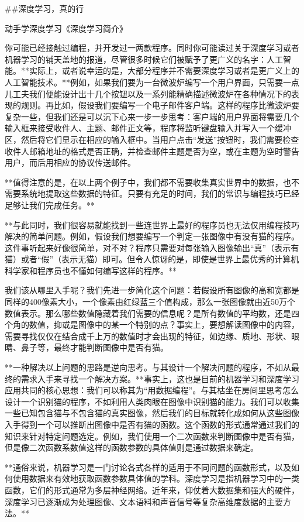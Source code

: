 

##深度学习，真的行

动手学深度学习《深度学习简介》

你可能已经接触过编程，并开发过一两款程序。同时你可能读过关于深度学习或者机器学习的铺天盖地的报道，尽管很多时候它们被赋予了更广义的名字：人工智能。**实际上，或者说幸运的是，大部分程序并不需要深度学习或者是更广义上的人工智能技术。**例如，如果我们要为一台微波炉编写一个用户界面，只需要一点儿工夫我们便能设计出十几个按钮以及一系列能精确描述微波炉在各种情况下的表现的规则。再比如，假设我们要编写一个电子邮件客户端。这样的程序比微波炉要复杂一些，但我们还是可以沉下心来一步一步思考：客户端的用户界面将需要几个输入框来接受收件人、主题、邮件正文等，程序将监听键盘输入并写入一个缓冲区，然后将它们显示在相应的输入框中。当用户点击“发送”按钮时，我们需要检查收件人邮箱地址的格式是否正确，并检查邮件主题是否为空，或在主题为空时警告用户，而后用相应的协议传送邮件。

**值得注意的是，在以上两个例子中，我们都不需要收集真实世界中的数据，也不需要系统地提取这些数据的特征。只要有充足的时间，我们的常识与编程技巧已经足够让我们完成任务。**

**与此同时，我们很容易就能找到一些连世界上最好的程序员也无法仅用编程技巧解决的简单问题。例如，假设我们想要编写一个判定一张图像中有没有猫的程序。这件事听起来好像很简单，对不对？程序只需要对每张输入图像输出“真”（表示有猫）或者“假”（表示无猫）即可。但令人惊讶的是，即使是世界上最优秀的计算机科学家和程序员也不懂如何编写这样的程序。**

我们该从哪里入手呢？我们先进一步简化这个问题：若假设所有图像的高和宽都是同样的400像素大小，一个像素由红绿蓝三个值构成，那么一张图像就由近50万个数值表示。那么哪些数值隐藏着我们需要的信息呢？是所有数值的平均数，还是四个角的数值，抑或是图像中的某一个特别的点？事实上，要想解读图像中的内容，需要寻找仅仅在结合成千上万的数值时才会出现的特征，如边缘、质地、形状、眼睛、鼻子等，最终才能判断图像中是否有猫。

**一种解决以上问题的思路是逆向思考。与其设计一个解决问题的程序，不如从最终的需求入手来寻找一个解决方案。**事实上，这也是目前的机器学习和深度学习应用共同的核心思想：我们可以称其为“用数据编程”。与其枯坐在房间里思考怎么设计一个识别猫的程序，不如利用人类肉眼在图像中识别猫的能力。我们可以收集一些已知包含猫与不包含猫的真实图像，然后我们的目标就转化成如何从这些图像入手得到一个可以推断出图像中是否有猫的函数。这个函数的形式通常通过我们的知识来针对特定问题选定。例如，我们使用一个二次函数来判断图像中是否有猫，但是像二次函数系数值这样的函数参数的具体值则是通过数据来确定。

**通俗来说，机器学习是一门讨论各式各样的适用于不同问题的函数形式，以及如何使用数据来有效地获取函数参数具体值的学科。深度学习是指机器学习中的一类函数，它们的形式通常为多层神经网络。近年来，仰仗着大数据集和强大的硬件，深度学习已逐渐成为处理图像、文本语料和声音信号等复杂高维度数据的主要方法。**

